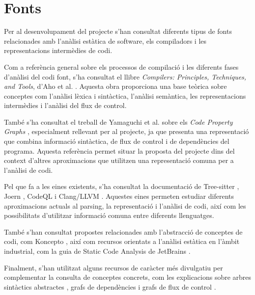 \section*{Fonts}

Per al desenvolupament del projecte s'han consultat diferents tipus de fonts relacionades amb l'anàlisi estàtica de software, els compiladors i les representacions intermèdies de codi.

Com a referència general sobre els processos de compilació i les diferents fases d'anàlisi del codi font, s'ha consultat el llibre \textit{Compilers: Principles, Techniques, and Tools}, d'Aho et al. \cite{aho_compilers}. Aquesta obra proporciona una base teòrica sobre conceptes com l'anàlisi lèxica i sintàctica, l'anàlisi semàntica, les representacions intermèdies i l'anàlisi del flux de control.

També s'ha consultat el treball de Yamaguchi et al. sobre els \textit{Code Property Graphs} \cite{yamaguchi_cpg}, especialment rellevant per al projecte, ja que presenta una representació que combina informació sintàctica, de flux de control i de dependències del programa. Aquesta referència permet situar la proposta del projecte dins del context d'altres aproximacions que utilitzen una representació comuna per a l'anàlisi de codi.

Pel que fa a les eines existents, s'ha consultat la documentació de Tree-sitter \cite{tree_sitter}, Joern \cite{joern_cpg}, CodeQL \cite{codeql} i Clang/LLVM \cite{clang_llvm}. Aquestes eines permeten estudiar diferents aproximacions actuals al parsing, la representació i l'anàlisi de codi, així com les possibilitats d'utilitzar informació comuna entre diferents llenguatges.

També s'han consultat propostes relacionades amb l'abstracció de conceptes de codi, com Koncepto \cite{koncepto}, així com recursos orientats a l'anàlisi estàtica en l'àmbit industrial, com la guia de Static Code Analysis de JetBrains \cite{static_code_analysis_jetbrains}.

Finalment, s'han utilitzat alguns recursos de caràcter més divulgatiu per complementar la consulta de conceptes concrets, com les explicacions sobre arbres sintàctics abstractes \cite{balapriya_ast}, grafs de dependències \cite{gfg_dependencygraph} i grafs de flux de control \cite{gfg_controlflowgraph}.

\printbibliography

